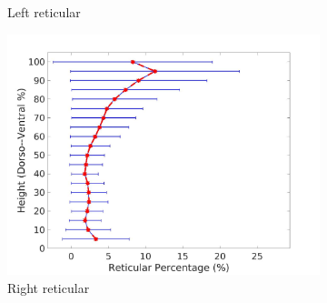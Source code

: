 \begin{figure}[H]
\begin{subfigure}{.42\linewidth}
  \caption{Left reticular}
  \label{fig:DiseaseDorsoToVentral-c} 
\end{subfigure} 
\begin{subfigure}{.42\linewidth}%
  \includegraphics[width=\linewidth,trim={{.0\wd0} {.0\wd0} {.0\wd0} {.0\wd0}},clip]{QuantitativeAnalysis/Image/RightLungReticularDiseaseDorsoToVentral.jpg}
  \caption{Right reticular}
  \label{fig:DiseaseDorsoToVentral-d}
\end{subfigure}
\begin{subfigure}{.42\linewidth}%

\end{subfigure}
\end{figure}

